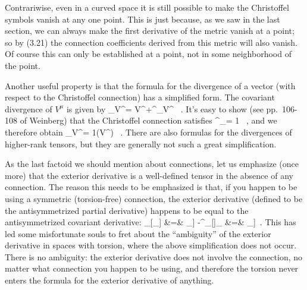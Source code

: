 Contrariwise, even in a curved space it is still possible to make
the Christoffel symbols vanish at any one point.  This is just
because, as we saw in the last section, we can always make the first 
derivative of the metric vanish at a point; so by (3.21) the connection
coefficients derived from this metric will also vanish.  Of course
this can only be established at a point, not in some neighborhood
of the point.

Another useful property is that the formula for the divergence
of a vector (with respect to the Christoffel connection) has a
simplified form.  The covariant divergence of $V^\mu$ is given by
\be
  \nabla_\mu V^\mu = \p\mu V^\mu +\Gamma^\mu_{\mu\lambda}V^\lambda
  \ .\label{3.26}
\ee
It's easy to show (see pp.~106-108 of Weinberg) that the Christoffel
connection satisfies
\be
  \Gamma^\mu_{\mu\lambda}= {1}\p\lambda
  \ ,\label{3.27}
\ee
and we therefore obtain
\be
  \nabla_\mu V^\mu = {1}\p\mu(V^\mu)
  \ .\label{3.28}
\ee
There are also formulas for the divergences of higher-rank tensors,
but they are generally not such a great simplification.

As the last factoid we should mention about connections, let us 
emphasize (once more) that the exterior derivative is a well-defined
tensor in the absence of any connection.  The reason this needs to
be emphasized is that, if you happen to be using a symmetric 
(torsion-free) connection, the exterior derivative (defined to be the
antisymmetrized partial derivative) happens to be equal to the
antisymmetrized covariant derivative:
\bea
  \nabla_{[\mu}\omega_{\nu]} &=& \p{[\mu}\omega_{\nu]}
  -\Gamma^\lambda_{[\mn]}\omega_\lambda \cr
  &=& \p{[\mu}\omega_{\nu]}\ . \label{3.29}
\eea
This has led some misfortunate souls to fret about the ``ambiguity''
of the exterior derivative in spaces with torsion, where the above
simplification does not occur.  There is no ambiguity: the exterior
derivative does not involve the connection, no matter what connection
you happen to be using, and therefore the torsion never enters the
formula for the exterior derivative of anything.

